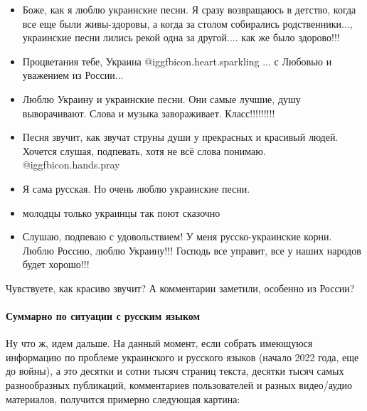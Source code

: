 \begin{itemize} %
\item Боже, как я люблю украинские песни. Я сразу возвращаюсь в детство, когда все
еще были живы-здоровы, а когда за столом собирались родственники..., украинские
песни лились рекой одна за другой.... как же было здорово!!!

\item Процветания тебе, Украина  @igg{fbicon.heart.sparkling} ... с Любовью и
уважением из России...

\item Люблю Украину и украинские песни. Они самые лучшие, душу выворачивают. Слова и
музыка завораживает. Класс!!!!!!!!!

\item Песня звучит, как звучат струны души у прекрасных и красивый людей. Хочется
слушая, подпевать, хотя  не  всё слова понимаю.  @igg{fbicon.hands.pray} 

\item Я сама русская. Но очень люблю украинские песни.

\item молодцы только украинцы так поют сказочно

\item Слушаю, подпеваю с удовольствием! У меня русско-украинские корни. Люблю Россию,
люблю Украину!!! Господь все управит, все у наших народов будет хорошо!!!
\end{itemize} %

Чувствуете, как красиво звучит? А комментарии заметили, особенно из России?

\paragraph{Суммарно по ситуации с русским языком}

Ну что ж, идем дальше. На данный момент, если собрать имеющуюся информацию
по проблеме украинского и русского языков (начало 2022 года, еще до войны), а
это десятки и сотни тысяч страниц текста, десятки тысяч самых разнообразных
публикаций, комментариев пользователей и разных видео/аудио материалов,
получится примерно следующая картина:

